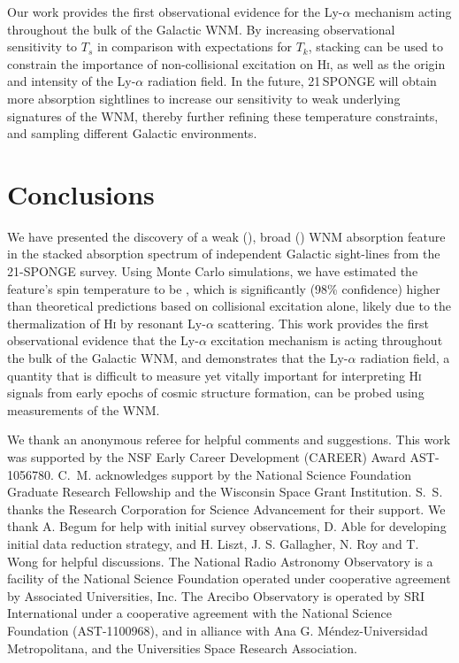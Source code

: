 \documentclass{aastex}
\begin{document}
Our work provides the first observational evidence for the Ly-$\alpha$ 
mechanism acting throughout the bulk of the Galactic WNM. 
By increasing observational sensitivity to $T_s$ in 
comparison with expectations for $T_k$, stacking can be 
used to constrain the importance of non-collisional 
excitation on H\textsc{i}, as well as the origin and intensity 
of the Ly-$\alpha$ radiation field.  In the future, 
21\,SPONGE will obtain more absorption sightlines to 
increase our sensitivity to weak underlying signatures of 
the WNM, thereby further refining these temperature 
constraints, and sampling different Galactic environments.

\section{Conclusions}
\label{s:conclusions}

We have presented the discovery of a weak 
(\MCpeak{}), broad (\MCfwhm{}) WNM absorption 
feature in the stacked absorption 
spectrum of \NoOfKeeps{} independent Galactic 
sight-lines from the 21-SPONGE survey.  Using 
Monte Carlo simulations, we have estimated the 
feature's spin temperature to be \StackedSpinTemp{}, 
which is significantly (98\% confidence) higher 
than theoretical predictions based on collisional 
excitation alone, likely due to the
thermalization of H\textsc{i} by resonant 
Ly-$\alpha$ scattering.
This work provides the first observational evidence that the 
Ly-$\alpha$ excitation mechanism is acting 
throughout the bulk of the Galactic WNM, and 
demonstrates that the Ly-$\alpha$ radiation 
field, a quantity that is difficult to measure yet
vitally important for interpreting H\textsc{i} 
signals from early epochs of cosmic structure 
formation, can be probed using measurements of the WNM.


\acknowledgements
We thank an anonymous referee for helpful comments and suggestions.
This work was supported by the NSF Early Career 
Development (CAREER) Award AST-1056780. C.~M. acknowledges 
support by the National Science Foundation Graduate Research 
Fellowship and the Wisconsin Space Grant Institution. 
S.~S. thanks the Research Corporation for Science 
Advancement for their support.  We thank A. Begum for 
help with initial survey observations, D. Able for developing
initial data reduction strategy, and H. Liszt, J. S. Gallagher, N. Roy
and T. Wong for helpful discussions. The National Radio 
Astronomy Observatory is a facility of the National Science 
Foundation operated under cooperative agreement by Associated 
Universities, Inc. The Arecibo Observatory is operated by 
SRI International under a cooperative agreement with the 
National Science Foundation (AST-1100968), and in alliance 
with Ana G. M\'endez-Universidad Metropolitana, and the 
Universities Space Research Association. 
\end{document}
